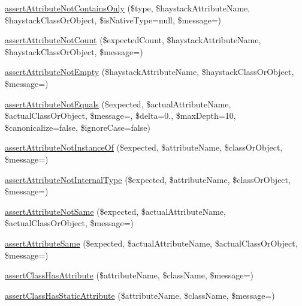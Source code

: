 \begin{DoxyCompactItemize}
\item 
\mbox{\hyperlink{_functions_8php_a20fe9e2e2fcf33eccb99f46ff7d09b81}{assert\+Attribute\+Not\+Contains\+Only}} (\$type, \$haystack\+Attribute\+Name, \$haystack\+Class\+Or\+Object, \$is\+Native\+Type=null, \$message=\textquotesingle{}\textquotesingle{})
\item 
\mbox{\hyperlink{_functions_8php_ac3d017cb1f21480ba054eaa061408c62}{assert\+Attribute\+Not\+Count}} (\$expected\+Count, \$haystack\+Attribute\+Name, \$haystack\+Class\+Or\+Object, \$message=\textquotesingle{}\textquotesingle{})
\item 
\mbox{\hyperlink{_functions_8php_a86ef38aef4d7024b1d2d960353b9d220}{assert\+Attribute\+Not\+Empty}} (\$haystack\+Attribute\+Name, \$haystack\+Class\+Or\+Object, \$message=\textquotesingle{}\textquotesingle{})
\item 
\mbox{\hyperlink{_functions_8php_ab201ec769ee34130b5f08f74a2968121}{assert\+Attribute\+Not\+Equals}} (\$expected, \$actual\+Attribute\+Name, \$actual\+Class\+Or\+Object, \$message=\textquotesingle{}\textquotesingle{}, \$delta=0., \$max\+Depth=10, \$canonicalize=false, \$ignore\+Case=false)
\item 
\mbox{\hyperlink{_functions_8php_aa02f995da674cd2ec931749e698343cb}{assert\+Attribute\+Not\+Instance\+Of}} (\$expected, \$attribute\+Name, \$class\+Or\+Object, \$message=\textquotesingle{}\textquotesingle{})
\item 
\mbox{\hyperlink{_functions_8php_af8606ef04ce922ccc458a4b6d0ff2a36}{assert\+Attribute\+Not\+Internal\+Type}} (\$expected, \$attribute\+Name, \$class\+Or\+Object, \$message=\textquotesingle{}\textquotesingle{})
\item 
\mbox{\hyperlink{_functions_8php_a11a09b5b24dc5b0e98f7479ca3278b17}{assert\+Attribute\+Not\+Same}} (\$expected, \$actual\+Attribute\+Name, \$actual\+Class\+Or\+Object, \$message=\textquotesingle{}\textquotesingle{})
\item 
\mbox{\hyperlink{_functions_8php_a30a0e035277d462a9ebfd3eef9f9c2ad}{assert\+Attribute\+Same}} (\$expected, \$actual\+Attribute\+Name, \$actual\+Class\+Or\+Object, \$message=\textquotesingle{}\textquotesingle{})
\item 
\mbox{\hyperlink{_functions_8php_a020f7f648e275ace00d8aecf3cce10e5}{assert\+Class\+Has\+Attribute}} (\$attribute\+Name, \$class\+Name, \$message=\textquotesingle{}\textquotesingle{})
\item 
\mbox{\hyperlink{_functions_8php_aee96dd9e6810b42fbc22db1732e8aba3}{assert\+Class\+Has\+Static\+Attribute}} (\$attribute\+Name, \$class\+Name, \$message=\textquotesingle{}\textquotesingle{})

\end{DoxyCompactItemize}
